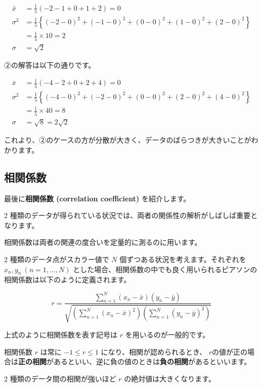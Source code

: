 \[
\begin{aligned}
\bar{x} &= \frac{1}{5} \left( -2 -1 + 0 + 1 + 2 \right) = 0 \\
\sigma^{2} &= \frac{1}{5} \left\{ \left( -2 -0 \right)^{2} + \left( -1 -0 \right)^{2} + (0 - 0)^{2} + (1 - 0)^{2} + (2 - 0)^{2} \right \} \\
&= \frac{1}{5} \times 10 = 2 \\
\sigma &= \sqrt{2}
\end{aligned}
\]


②の解答は以下の通りです。


\[
\begin{aligned}
\overline{x} &= \frac{1}{5} ( -4 -2 + 0 + 2 + 4 ) = 0 \\
\sigma^2 &= \frac{1}{5}
\left\{ (-4 -0)^2 + (-2 -0)^2 + (0 - 0)^2 + (2 - 0)^2 + (4 - 0)^2 \right\} \\
&= \frac{1}{5} \times 40 = 8 \\
\sigma &= \sqrt{8} = 2 \sqrt{2}
\end{aligned}
\]


これより、②のケースの方が分散が大きく、データのばらつきが大きいことがわかります。


\subsection{相関係数}


最後に\textbf{相関係数 (correlation coefficient)} を紹介します。


2 種類のデータが得られている状況では、両者の関係性の解析がしばしば重要となります。

相関係数は両者の関連の度合いを定量的に測るのに用います。


2 種類のデータ点がスカラー値で $N$ 個ずつある状況を考えます。それぞれを $x_n, y_n  \ (n=1,\dots,N)$ とした場合、相関係数の中でも良く用いられるピアソンの相関係数は以下のように定義されます。


\[
r = \frac{\sum_{n=1}^{N} (x_{n}-\bar{x})(y_{n}-\bar{y}) }{\sqrt{\left( \displaystyle \sum_{n=1}^N(x_{n}-\bar{x})^2 \right) \left( \displaystyle \sum_{n=1}^N(y_{n}-\bar{y})^2 \right) }}
\]


上式のように相関係数を表す記号は $r$ を用いるのが一般的です。

相関係数 $r$ は常に $-1 \leq r \leq 1$ になり、相関が認められるとき、 $r$の値が正の場合は\textbf{正の相関}があるといい、逆に負の値のときは\textbf{負の相関}があるといいます。


2 種類のデータ間の相関が強いほど $r$ の絶対値は大きくなります。

